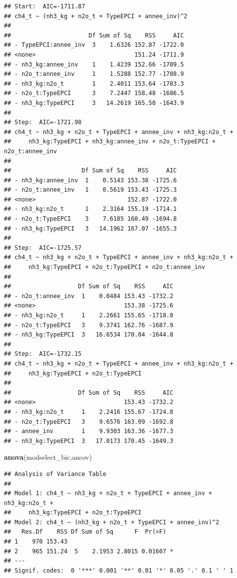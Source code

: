 \documentclass[
]{article}
\newenvironment{Shaded}{\begin{snugshade}}{\end{snugshade}}
\newcommand{\FunctionTok}[1]{\textcolor[rgb]{0.13,0.29,0.53}{\textbf{#1}}}
\newcommand{\NormalTok}[1]{#1}
\begin{document}
\begin{verbatim}
## Start:  AIC=-1711.87
## ch4_t ~ (nh3_kg + n2o_t + TypeEPCI + annee_inv)^2
## 
##                      Df Sum of Sq    RSS     AIC
## - TypeEPCI:annee_inv  3    1.6326 152.87 -1722.0
## <none>                            151.24 -1711.9
## - nh3_kg:annee_inv    1    1.4239 152.66 -1709.5
## - n2o_t:annee_inv     1    1.5288 152.77 -1708.9
## - nh3_kg:n2o_t        1    2.4011 153.64 -1703.3
## - n2o_t:TypeEPCI      3    7.2447 158.48 -1686.5
## - nh3_kg:TypeEPCI     3   14.2619 165.50 -1643.9
## 
## Step:  AIC=-1721.98
## ch4_t ~ nh3_kg + n2o_t + TypeEPCI + annee_inv + nh3_kg:n2o_t + 
##     nh3_kg:TypeEPCI + nh3_kg:annee_inv + n2o_t:TypeEPCI + n2o_t:annee_inv
## 
##                    Df Sum of Sq    RSS     AIC
## - nh3_kg:annee_inv  1    0.5143 153.38 -1725.6
## - n2o_t:annee_inv   1    0.5619 153.43 -1725.3
## <none>                          152.87 -1722.0
## - nh3_kg:n2o_t      1    2.3164 155.19 -1714.1
## - n2o_t:TypeEPCI    3    7.6185 160.49 -1694.8
## - nh3_kg:TypeEPCI   3   14.1962 167.07 -1655.3
## 
## Step:  AIC=-1725.57
## ch4_t ~ nh3_kg + n2o_t + TypeEPCI + annee_inv + nh3_kg:n2o_t + 
##     nh3_kg:TypeEPCI + n2o_t:TypeEPCI + n2o_t:annee_inv
## 
##                   Df Sum of Sq    RSS     AIC
## - n2o_t:annee_inv  1    0.0484 153.43 -1732.2
## <none>                         153.38 -1725.6
## - nh3_kg:n2o_t     1    2.2661 155.65 -1718.0
## - n2o_t:TypeEPCI   3    9.3741 162.76 -1687.9
## - nh3_kg:TypeEPCI  3   16.6534 170.04 -1644.8
## 
## Step:  AIC=-1732.15
## ch4_t ~ nh3_kg + n2o_t + TypeEPCI + annee_inv + nh3_kg:n2o_t + 
##     nh3_kg:TypeEPCI + n2o_t:TypeEPCI
## 
##                   Df Sum of Sq    RSS     AIC
## <none>                         153.43 -1732.2
## - nh3_kg:n2o_t     1    2.2416 155.67 -1724.8
## - n2o_t:TypeEPCI   3    9.6576 163.09 -1692.8
## - annee_inv        1    9.9303 163.36 -1677.3
## - nh3_kg:TypeEPCI  3   17.0173 170.45 -1649.3
\end{verbatim}

\begin{Shaded}
\begin{Highlighting}[]
\FunctionTok{anova}\NormalTok{(modselect\_bic,ancov)}
\end{Highlighting}
\end{Shaded}

\begin{verbatim}
## Analysis of Variance Table
## 
## Model 1: ch4_t ~ nh3_kg + n2o_t + TypeEPCI + annee_inv + nh3_kg:n2o_t + 
##     nh3_kg:TypeEPCI + n2o_t:TypeEPCI
## Model 2: ch4_t ~ (nh3_kg + n2o_t + TypeEPCI + annee_inv)^2
##   Res.Df    RSS Df Sum of Sq      F  Pr(>F)  
## 1    970 153.43                              
## 2    965 151.24  5    2.1953 2.8015 0.01607 *
## ---
## Signif. codes:  0 '***' 0.001 '**' 0.01 '*' 0.05 '.' 0.1 ' ' 1
\end{verbatim}
\end{document}
